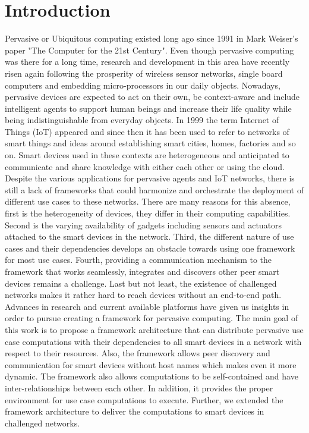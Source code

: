 
\chapter{Introduction}\label{chapter:introduction}

 Pervasive or Ubiquitous computing existed long ago since 1991 in Mark Weiser's paper "The Computer for the 21st Century". Even though pervasive computing  was there for a long time, research and development in this area have recently risen again following the  prosperity of wireless sensor networks, single board computers and embedding micro-processors in our daily objects. Nowadays, pervasive devices are expected to act on their own, be context-aware and include intelligent agents to support human beings and increase their life quality while being indistinguishable from  everyday objects. In 1999 the term Internet of Things (IoT) appeared and since then it has been used to refer to networks of smart things and  ideas around establishing smart cities, homes, factories and so on. Smart devices used in these contexts are heterogeneous and  anticipated to communicate and share knowledge with either each other or using the cloud. Despite the various applications for pervasive agents and IoT networks, there is still a lack of frameworks that could harmonize and orchestrate the deployment of different use cases to these networks. There are many reasons for this absence, first is the heterogeneity of devices, they differ in their computing capabilities. Second is the varying  availability of gadgets including sensors and actuators attached to the smart devices in the network. Third, the different nature of use cases and their dependencies develops an obstacle towards using one framework for most use cases. Fourth, providing a communication mechanism to the framework that works seamlessly, integrates and discovers other peer smart devices remains a challenge. Last but not least, the existence of challenged networks makes it rather hard to reach devices without an end-to-end path. Advances in research and current available platforms have given us insights in order to pursue creating a framework for pervasive computing. The main goal of this work is to propose a framework architecture that can distribute  pervasive use case computations with their dependencies to all smart devices in a network with respect to their resources.
  Also, the framework allows peer discovery and communication for  smart devices without host names which makes even it more dynamic. The framework also allows computations to  be self-contained and have inter-relationships between each other. In addition, it provides the proper environment for use case computations to execute. Further, we extended the framework architecture to deliver the computations to smart devices in challenged networks. 
 
